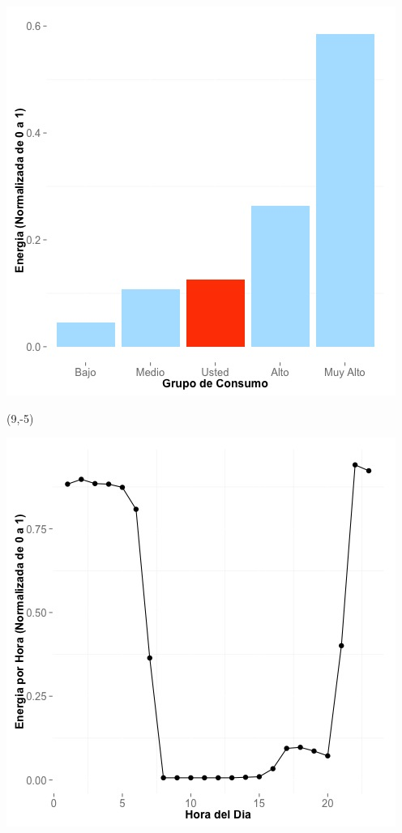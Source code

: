 \documentclass{article}\usepackage[]{graphicx}\usepackage[]{color}
\newenvironment{knitrout}{}{} %
\begin{document}
\begin{knitrout}
\color{fgcolor}
\includegraphics[scale=0.65]{figure/A4_neighbor_plot} 
\end{knitrout}

 \begin{textblock}{1}(9,-5)
\begin{minipage}{20em}
\begingroup

\endgroup
\end{minipage}
\end{textblock}


\begin{knitrout}
\color{fgcolor}
\includegraphics[scale=0.65]{figure/A4_plot_norm_median} 
\end{knitrout}
\end{document}
